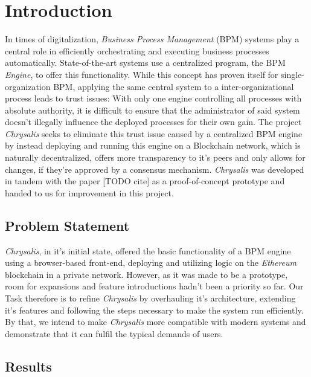 %
\chapter{Introduction}
\label{sec:intro}

In times of digitalization, \emph{Business Process Management} (BPM) systems play a central role in efficiently orchestrating and executing business processes automatically. State-of-the-art systems use a centralized program, the BPM \emph{Engine}, to offer this functionality. While this concept has proven itself for single-organization BPM, applying the same central system to a inter-organizational process leads to trust issues: With only one engine controlling all processes with absolute authority, it is difficult to ensure that the administrator of said system doesn't illegally influence the deployed processes for their own gain. \newline 
 The project \emph{Chrysalis} seeks to eliminate this trust issue caused by a centralized BPM engine by instead deploying and running this engine on a Blockchain network, which is naturally decentralized, offers more transparency to it's peers and only allows for changes, if they're approved by a consensus mechanism. \newline
 \emph{Chrysalis} was developed in tandem with the paper [TODO cite] as a proof-of-concept prototype and handed to us for improvement in this project.


\section{Problem Statement}
\label{sec:intro:problem}

\emph{Chrysalis}, in it's initial state, offered the basic functionality of a BPM engine using a browser-based front-end, deploying and utilizing logic on the \emph{Ethereum} blockchain in a private network. However, as it was made to be a prototype, room for expansions and feature introductions hadn't been a priority so far. \newline
Our Task therefore is to refine \emph{Chrysalis} by overhauling it's architecture, extending it's features and following the steps necessary to make the system run efficiently. By that, we intend to make \emph{Chrysalis} more compatible with modern systems and demonstrate that it can fulfil the typical demands of users. \newline

\section{Results}
\label{sec:intro:results}

